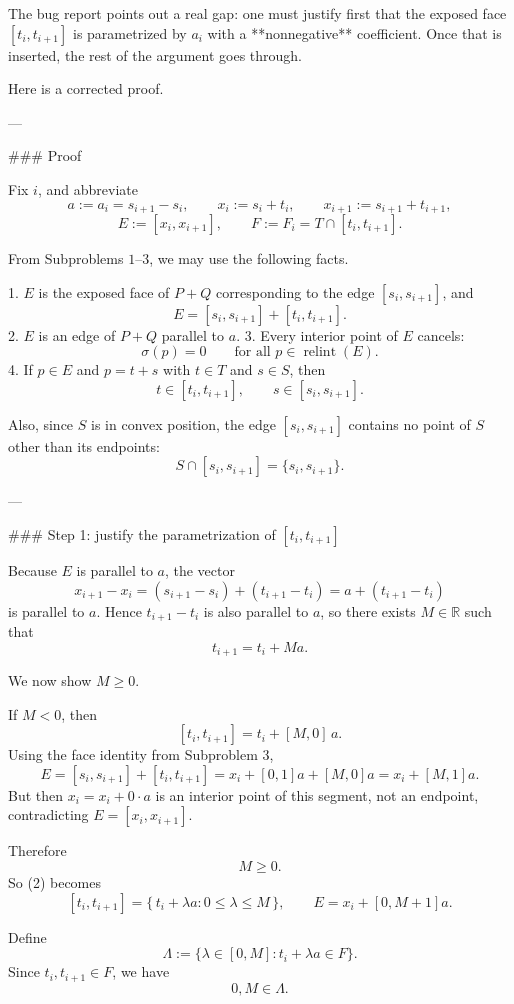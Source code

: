 The bug report points out a real gap: one must justify first that the exposed face \([t_i,t_{i+1}]\) is parametrized by \(a_i\) with a **nonnegative** coefficient. Once that is inserted, the rest of the argument goes through.

Here is a corrected proof.

---

### Proof

Fix \(i\), and abbreviate
\[
a:=a_i=s_{i+1}-s_i,\qquad
x_i:=s_i+t_i,\qquad
x_{i+1}:=s_{i+1}+t_{i+1},
\]
\[
E:=[x_i,x_{i+1}],\qquad
F:=F_i=T\cap[t_i,t_{i+1}].
\]

From Subproblems \(1\)–\(3\), we may use the following facts.

1. \(E\) is the exposed face of \(P+Q\) corresponding to the edge \([s_i,s_{i+1}]\), and
   \[
   E=[s_i,s_{i+1}]+[t_i,t_{i+1}].
   \]
2. \(E\) is an edge of \(P+Q\) parallel to \(a\).
3. Every interior point of \(E\) cancels:
   \[
   \sigma(p)=0\qquad\text{for all }p\in\operatorname{relint}(E).
   \]
4. If \(p\in E\) and \(p=t+s\) with \(t\in T\) and \(s\in S\), then
   \[
   t\in[t_i,t_{i+1}],\qquad s\in[s_i,s_{i+1}].
   \]

Also, since \(S\) is in convex position, the edge \([s_i,s_{i+1}]\) contains no point of \(S\) other than its endpoints:
\[
S\cap [s_i,s_{i+1}]=\{s_i,s_{i+1}\}.
\tag{1}
\]

---

### Step 1: justify the parametrization of \([t_i,t_{i+1}]\)

Because \(E\) is parallel to \(a\), the vector
\[
x_{i+1}-x_i=(s_{i+1}-s_i)+(t_{i+1}-t_i)=a+(t_{i+1}-t_i)
\]
is parallel to \(a\). Hence \(t_{i+1}-t_i\) is also parallel to \(a\), so there exists \(M\in\mathbb{R}\) such that
\[
t_{i+1}=t_i+Ma.
\tag{2}
\]

We now show \(M\ge 0\).

If \(M<0\), then
\[
[t_i,t_{i+1}]=t_i+[M,0]\,a.
\]
Using the face identity from Subproblem \(3\),
\[
E=[s_i,s_{i+1}]+[t_i,t_{i+1}]
  =x_i+[0,1]a+[M,0]a
  =x_i+[M,1]a.
\]
But then \(x_i=x_i+0\cdot a\) is an interior point of this segment, not an endpoint, contradicting \(E=[x_i,x_{i+1}]\).

Therefore
\[
M\ge 0.
\]
So (2) becomes
\[
[t_i,t_{i+1}]
=\{\,t_i+\lambda a:0\le \lambda\le M\,\},
\qquad
E=x_i+[0,M+1]a.
\tag{3}
\]

Define
\[
\Lambda:=\{\lambda\in[0,M]: t_i+\lambda a\in F\}.
\]
Since \(t_i,t_{i+1}\in F\), we have
\[
0,M\in\Lambda.
\tag{4}
\]

